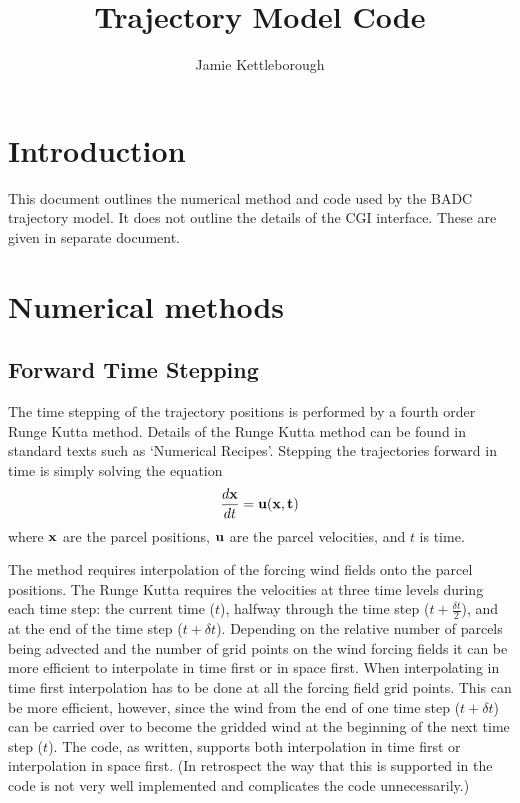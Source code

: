 \documentclass[a4paper]{article}
\title{Trajectory Model Code}
\author{Jamie Kettleborough}
\begin{document}
\maketitle

\section{Introduction}

This document outlines the numerical method and code used by the BADC
trajectory model.  It does not outline the details of the CGI
interface.
These are given in separate document.

\section{Numerical methods}

\subsection{Forward Time Stepping}
The time stepping of the trajectory positions is performed by a fourth
order Runge Kutta method.  Details of the Runge Kutta method can be
found in standard texts such as `Numerical Recipes'.  Stepping the
trajectories forward in time is simply solving the equation
\begin{displaymath}
 \frac{d\bf{x}}{dt}=\bf{u}(\bf{x},t)
\end{displaymath}
where $\bf{x}$ are the parcel positions, $\bf{u}$ are the parcel
velocities, and $t$ is time.

The method requires interpolation of the forcing wind
fields onto the parcel positions.  The Runge Kutta requires the
velocities at three time levels during each time step: the current
time ($t$), halfway through the time step ($t+\frac{\delta t}{2}$), and
at the end of the time step ($t+\delta t$).  Depending on the relative
number of parcels being advected and the number of grid points on the
wind forcing fields it can be more efficient to interpolate in time
first or in space first.  When interpolating in time first
interpolation has to be done at all the forcing field grid points.
This can be more efficient, however, since the wind from the end of
one time step ($t+\delta t$) can be carried over to become the gridded
wind at the beginning of the next time step ($t$).  The code, as
written, supports both interpolation in time first or interpolation in
space first.  (In retrospect the way that this is supported in the
code is not very well implemented and complicates the code
unnecessarily.)
\end{document}
